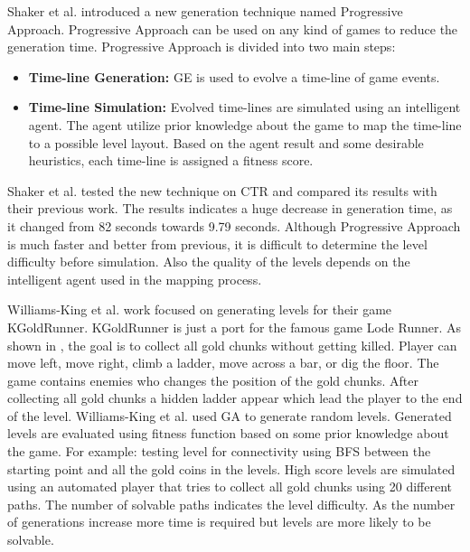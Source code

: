 Shaker et al.\cite{ctrProgressiveApproach} introduced a new generation technique named Progressive Approach. Progressive Approach can be used on any kind of games to reduce the generation time. Progressive Approach is divided into two main steps:
\begin{itemize} \itemsep0pt \parskip0pt 
	\item \textbf{Time-line Generation:} GE is used to evolve a time-line of game events.
	\item \textbf{Time-line Simulation:} Evolved time-lines are simulated using an intelligent agent. The agent utilize prior knowledge about the game to map the time-line to a possible level layout. Based on the agent result and some desirable heuristics, each time-line is assigned a fitness score.
\end{itemize}
Shaker et al. tested the new technique on CTR and compared its results with their previous work\cite{ctrSimulationApproach}. The results indicates a huge decrease in generation time, as it changed from 82 seconds towards 9.79 seconds. Although Progressive Approach is much faster and better from previous, it is difficult to determine the level difficulty before simulation. Also the quality of the levels depends on the intelligent agent used in the mapping process.\\\par


Williams-King et al.\cite{kgrAutomaticGeneration} work focused on generating levels for their game KGoldRunner. KGoldRunner is just a port for the famous game Lode Runner\cite{lodeRunner}. As shown in , the goal is to collect all gold chunks without getting killed. Player can move left, move right, climb a ladder, move across a bar, or dig the floor. The game contains enemies who changes the position of the gold chunks. After collecting all gold chunks a hidden ladder appear which lead the player to the end of the level. Williams-King et al. used GA to generate random levels. Generated levels are evaluated using fitness function based on some prior knowledge about the game. For example: testing level for connectivity using BFS between the starting point and all the gold coins in the levels. High score levels are simulated using an automated player that tries to collect all gold chunks using 20 different paths. The number of solvable paths indicates the level difficulty. As the number of generations increase more time is required but levels are more likely to be solvable.

